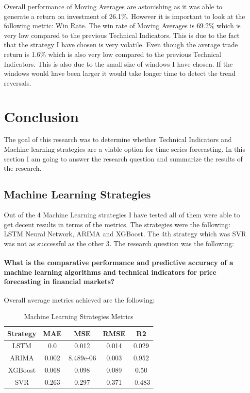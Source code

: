\documentclass{imc-inf}
\begin{document}
	Overall performance of Moving Averages are astonishing as it was able to generate a return on investment of 26.1\%. However it is important to look at the following 
	metric: Win Rate. The win rate of Moving Averages is 69.2\% which is very low compared to the previous Technical Indicators. This is due to the fact that the strategy I have 
	chosen is very volatile. Even though the average trade return is 1.6\% which is also very low compared to the previous Technical Indicators. This is also due to the small size 
	of windows I have chosen. If the windows would have been larger it would take longer time to detect the trend reversals.
	
	
	\chapter{Conclusion}
	
	The goal of this research was to determine whether Technical Indicators and Machine learning strategies are a viable option for time series forecasting. In this section I am going to answer 
	the research question and summarize the results of the research.
	\section{Machine Learning Strategies}
	Out of the 4 Machine Learning strategies 
	I have tested all of them were able to get decent results in terms of the metrics. The strategies were the following: LSTM Neural Network, ARIMA and XGBoost. The 4th strategy which was SVR was 
	not as successful as the other 3.
	The research question was the following:
	\subsubsection{
		What is the comparative performance and predictive accuracy of a machine learning
		algorithms and technical indicators for price forecasting in financial markets?
	} 
	
	
	Overall average metrics achieved are the following:
	\begin{table}[h!]
		\centering
		\begin{tabular}{|c|c|c|c|c|}
			\hline
			\textbf{Strategy} &		\textbf{MAE} & \textbf{MSE} & \textbf{RMSE} & \textbf{R2} \\ \hline
			LSTM             				 & 0.0 & 0.012 & 0.014 & 0.029  \\ \hline
			ARIMA            				 & 0.002 & 8.489e-06  & 0.003 & 0.952 \\ \hline
			XGBoost      	 				 &  0.068 & 0.098 &  0.089 &  0.50 \\ \hline
			SVR        		 				 & 0.263 & 0.297 & 0.371 & -0.483 \\ \hline
			
		\end{tabular}
		\caption{Machine Learning Strategies Metrics}
		\label{tab:machine_learning_strategies_metrics}
	\end{table}
	
\end{document}
